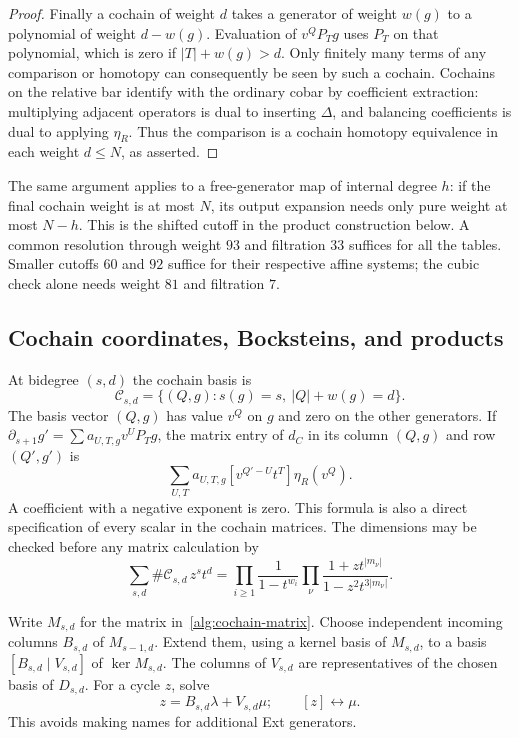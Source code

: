 \begin{proof}
Finally a cochain of weight $d$ takes a generator of weight $w(g)$ to
a polynomial of weight $d-w(g)$.  Evaluation of $v^QP_Tg$ uses
$P_T$ on that polynomial, which is zero if $|T|+w(g)>d$.
Only finitely many terms of any comparison or homotopy can consequently
be seen by such a cochain.  Cochains on the relative bar identify with
the ordinary cobar by coefficient extraction: multiplying adjacent
operators is dual to inserting $\Delta$, and balancing coefficients
is dual to applying $\eta_R$.  Thus the comparison is a cochain
homotopy equivalence in each weight $d\leq N$, as asserted.
\end{proof}

The same argument applies to a free-generator map of internal degree
$h$: if the final cochain weight is at most $N$, its output expansion
needs only pure weight at most $N-h$.  This is the shifted cutoff in
the product construction below.  A common resolution through weight
$93$ and filtration $33$ suffices for all the tables.  Smaller cutoffs
$60$ and $92$ suffice for their respective affine systems; the cubic
check alone needs weight $81$ and filtration $7$.

\subsection{Cochain coordinates, Bocksteins, and products}

At bidegree $(s,d)$ the cochain basis is
\begin{equation}\label{alg:cochain-basis}
 \mathcal C_{s,d}=\{(Q,g):s(g)=s,\ |Q|+w(g)=d\}.
\end{equation}
The basis vector $(Q,g)$ has value $v^Q$ on $g$ and zero on the other
generators.  If
$\partial_{s+1}g'=\sum a_{U,T,g}v^UP_Tg$, the matrix entry of $d_C$
in its column $(Q,g)$ and row $(Q',g')$ is
\begin{equation}\label{alg:cochain-matrix}
 \sum_{U,T}a_{U,T,g}
       [v^{Q'-U}t^T]\eta_R(v^Q).
\end{equation}
A coefficient with a negative exponent is zero.  This formula is also
a direct specification of every scalar in the cochain matrices.
The dimensions may be checked before any matrix calculation by
\begin{equation}\label{alg:dimension-series}
 \sum_{s,d}\#\mathcal C_{s,d}\,z^st^d
 =\prod_{i\geq1}\frac1{1-t^{w_i}}
    \prod_{\nu}\frac{1+zt^{|m_\nu|}}
                       {1-z^2t^{3|m_\nu|}}.
\end{equation}

Write $M_{s,d}$ for the matrix in~\eqref{alg:cochain-matrix}.
Choose independent incoming columns $B_{s,d}$ of $M_{s-1,d}$.
Extend them, using a kernel basis of $M_{s,d}$, to a basis
$[B_{s,d}\mid V_{s,d}]$ of $\ker M_{s,d}$.  The columns of $V_{s,d}$
are representatives of the chosen basis of $D_{s,d}$.  For a cycle
$z$, solve
\begin{equation}\label{alg:quotient-coordinates}
 z=B_{s,d}\lambda+V_{s,d}\mu;
 \qquad [z]\longleftrightarrow\mu.
\end{equation}
This avoids making names for additional Ext generators.

